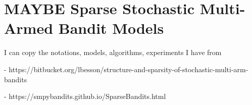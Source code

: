 \chapter{MAYBE Sparse Stochastic Multi-Armed Bandit Models}
\label{app:3:SparseBandits}

I can copy the notations, models, algorithms, experiments I have from

- https://bitbucket.org/lbesson/structure-and-sparsity-of-stochastic-multi-arm-bandits

- https://smpybandits.github.io/SparseBandits.html
